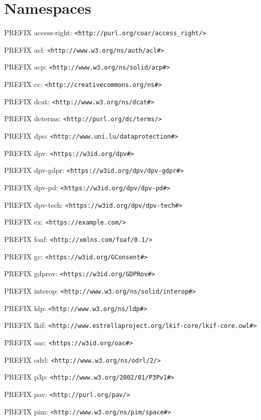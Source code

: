 \section*{Namespaces}
\label{sec::namespaces}

\vspace{10 mm}

PREFIX access-right: \texttt{<http://purl.org/coar/access\_right/>}

PREFIX acl: \texttt{<http://www.w3.org/ns/auth/acl\#>}

PREFIX acp: \texttt{<http://www.w3.org/ns/solid/acp\#>}

PREFIX cc: \texttt{<http://creativecommons.org/ns\#>}

PREFIX dcat: \texttt{<http://www.w3.org/ns/dcat\#>}

PREFIX dcterms: \texttt{<http://purl.org/dc/terms/>}

PREFIX dpo: \texttt{<http://www.uni.lu/dataprotection\#>}

PREFIX dpv: \texttt{<https://w3id.org/dpv\#>}

PREFIX dpv-gdpr: \texttt{<https://w3id.org/dpv/dpv-gdpr\#>}

PREFIX dpv-pd: \texttt{<https://w3id.org/dpv/dpv-pd\#>}

PREFIX dpv-tech: \texttt{<https://w3id.org/dpv/dpv-tech\#>}

PREFIX ex: \texttt{<https://example.com/>}

PREFIX foaf: \texttt{<http://xmlns.com/foaf/0.1/>}

PREFIX gc: \texttt{<https://w3id.org/GConsent\#>}

PREFIX gdprov: \texttt{<https://w3id.org/GDPRov\#>}

PREFIX interop: \texttt{<http://www.w3.org/ns/solid/interop\#>}

PREFIX ldp: \texttt{<http://www.w3.org/ns/ldp\#>}

PREFIX lkif: \texttt{<http://www.estrellaproject.org/lkif-core/lkif-core.owl\#>} %

PREFIX oac: \texttt{<https://w3id.org/oac\#>}

PREFIX odrl: \texttt{<http://www.w3.org/ns/odrl/2/>}

PREFIX p3p: \texttt{<http://www.w3.org/2002/01/P3Pv1\#>}

PREFIX pav: \texttt{<http://purl.org/pav/>}

PREFIX pim: \texttt{<http://www.w3.org/ns/pim/space\#>}

